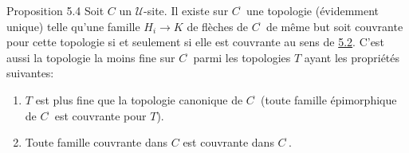 \begin{enonce*}{Proposition 5.4}
Soit $C$ un $𝒰$-site. Il existe sur
$C^{\widehat{\phantom{,}}}$ une topologie (évidemment unique)
telle qu'une famille $H_i\rightarrow K$ de flèches de
$C^{\widehat{\phantom{,}}}$ de même but soit couvrante pour cette
topologie si et seulement si elle est couvrante au sens de
\hyperref[II.def5.2]{5.2}. C'est aussi la topologie la moins fine sur
$C^{\widehat{\phantom{,}}}$ parmi les topologies $T$ ayant les
propriétés suivantes:
\begin{enumerate}
\renewcommand{\theenumi}{\alph{enumi}}
\renewcommand{\labelenumi}{\theenumi)}
\item $T$ est plus fine que la topologie canonique de
  $C^{\widehat{\phantom{,}}}$ (\ie toute famille épimorphique de
  $C^{\widehat{\phantom{,}}}$ est couvrante pour $T$).

\item Toute famille couvrante dans $C$ est couvrante dans
  $C^{\widehat{\phantom{,}}}$.
\end{enumerate}
\end{enonce*}


